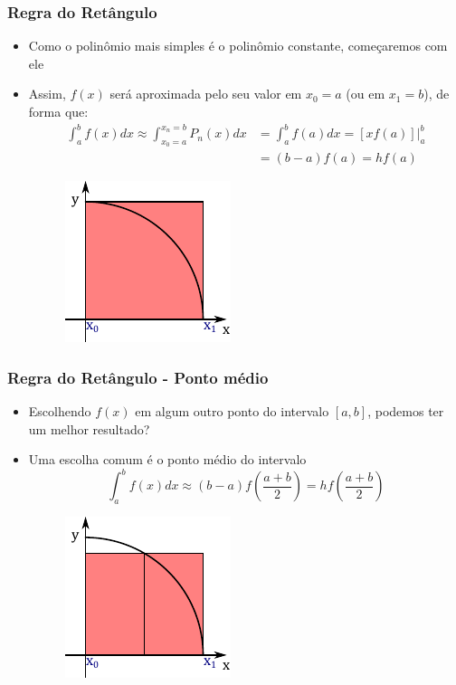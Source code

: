 \documentclass{beamer}
\theoremstyle{mystyle}
\begin{document}
	\begin{frame}
		\frametitle{Regra do Retângulo}
		\begin{itemize}
			\item Como o polinômio mais simples é o polinômio constante, começaremos com ele
			\item Assim, $ f (x) $ será aproximada pelo seu valor em $ x_{0} = a $ (ou em $ x_{1} = b $), de forma que:
			\begin{align*}
				\int_{a}^{b} f(x) dx \approx \int_{x_{0} = a}^{x_{n} = b} P_{n}(x) dx & = \int_{a}^{b} f(a) dx = \left. \left[ xf(a)\right] \right|_{a}^{b}\\
				& = (b-a)f(a) = hf(a)
			\end{align*}
			\begin{figure}
				\centering
				\includegraphics[width=0.4\linewidth]{Figuras/grafico_02}
				\label{fig:grafico02}
			\end{figure}
		\end{itemize}
	\end{frame}
	
	\begin{frame}
		\frametitle{Regra do Retângulo - Ponto médio}
		\begin{itemize}
			\item Escolhendo $ f (x) $ em algum outro ponto do intervalo $ [a, b] $, podemos ter um melhor resultado?
			\item Uma escolha comum é o ponto médio do intervalo
			\begin{equation*}
				\int_{a}^{b} f(x) dx \approx (b-a)f\left( \dfrac{a + b}{2}\right) = hf\left( \dfrac{a + b}{2}\right)
			\end{equation*}
			\begin{figure}
				\centering
				\includegraphics[width=0.4\linewidth]{Figuras/grafico_03}
				\label{fig:grafico03}
			\end{figure}
		\end{itemize}
	\end{frame}
\end{document}
